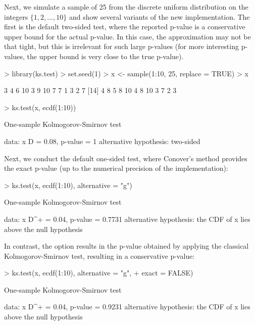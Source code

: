 Next, we simulate a sample of 25 from the discrete uniform distribution on
the integers $\{1, 2, \ldots, 10\}$ and show several variants of the
new  implementation.  The first is the default two-sided test,
where the reported p-value is a conservative upper bound for the actual
p-value.  In this case, the approximation may not be that tight, but this is
irrelevant for such large p-values (for more interesting p-values, the
upper bound is very close to the true p-value).
\begin{Schunk}
\begin{Sinput}
> library(ks.test)
> set.seed(1)
> x <- sample(1:10, 25, replace = TRUE)
> x
\end{Sinput}
\begin{Soutput}
 [1]  3  4  6 10  3  9 10  7  7  1  3  2  7
[14]  4  8  5  8 10  4  8 10  3  7  2  3
\end{Soutput}
\begin{Sinput}
> ks.test(x, ecdf(1:10))
\end{Sinput}
\begin{Soutput}
	One-sample Kolmogorov-Smirnov test

data:  x 
D = 0.08, p-value = 1
alternative hypothesis: two-sided 
\end{Soutput}
\end{Schunk}
Next, we conduct the default one-sided test, where Conover's method
provides the exact p-value (up to the numerical precision of the
implementation):
\begin{Schunk}
\begin{Sinput}
> ks.test(x, ecdf(1:10), alternative = "g")
\end{Sinput}
\begin{Soutput}
	One-sample Kolmogorov-Smirnov test

data:  x 
D^+ = 0.04, p-value = 0.7731
alternative hypothesis:
the CDF of x lies above the null hypothesis 
\end{Soutput}
\end{Schunk}
In contrast, the option  results in the
p-value obtained by applying the classical Kolmogorov-Smirnov
test, resulting in a conservative p-value:
\begin{Schunk}
\begin{Sinput}
> ks.test(x, ecdf(1:10), alternative = "g", 
+         exact = FALSE)
\end{Sinput}
\begin{Soutput}
	One-sample Kolmogorov-Smirnov test

data:  x 
D^+ = 0.04, p-value = 0.9231
alternative hypothesis:
the CDF of x lies above the null hypothesis 
\end{Soutput}
\end{Schunk}
